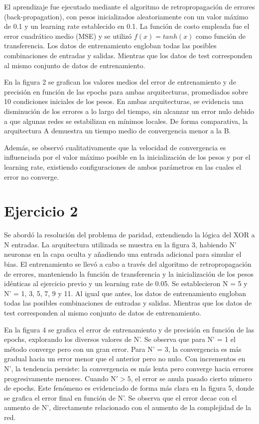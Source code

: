 \documentclass[aps,prb,twocolumn,superscriptaddress,floatfix,longbibliography]{revtex4-2}
\newcounter{para}
\begin{document}
El aprendizaje fue ejecutado mediante el algoritmo de retropropagación de errores (back-propagation), con pesos inicializados aleatoriamente con un valor máximo de 0.1 y un learning rate establecido en 0.1. La función de costo empleada fue el error cuadrático medio (MSE) y se utilizó $f(x) = tanh(x)$ como función de transferencia. Los datos de entrenamiento engloban todas las posibles combinaciones de entradas y salidas. Mientras que los datos de test corresponden al mismo conjunto de datos de entrenamiento.

En la figura 2 se grafican los valores medios del error de entrenamiento y de precisión en función de las epochs para ambas arquitecturas, promediados sobre 10 condiciones iniciales de los pesos. En ambas arquitecturas, se evidencia una disminución de los errores a lo largo del tiempo, sin alcanzar un error nulo debido a que algunas redes se estabilizan en mínimos locales. De forma comparativa, la arquitectura A demuestra un tiempo medio de convergencia menor a la B.


Además, se observó cualitativamente que la velocidad de convergencia es influenciada por el valor máximo posible en la inicialización de los pesos y por el learning rate, existiendo configuraciones de ambos parámetros en las cuales el error no converge.

\section*{Ejercicio 2}



Se abordó la resolución del problema de paridad, extendiendo la lógica del XOR a N entradas. La arquitectura utilizada se muestra en la figura 3, habiendo N' neuronas en la capa oculta y añadiendo una entrada adicional para simular el bias. El entrenamiento se llevó a cabo a través del algoritmo de retropropagación de errores, manteniendo la función de transferencia y la inicialización de los pesos idénticas al ejercicio previo y un learning rate de 0.05. Se establecieron N = 5 y N' = 1, 3, 5, 7, 9 y 11. Al igual que antes, los datos de entrenamiento engloban todas las posibles combinaciones de entradas y salidas. Mientras que los datos de test corresponden al mismo conjunto de datos de entrenamiento.


En la figura 4 se grafica el error de entrenamiento y de precisión en función de las epochs, explorando los diversos valores de N'. Se observa que para N' = 1 el método converge pero con un gran error. Para N' = 3, la convergencia es más gradual hacia un error menor que el anterior pero no nulo. Con incrementos en N', la tendencia persiste: la convergencia es más lenta pero converge hacia errores progresivamente menores. Cuando $\mathrm{N'} > 5$, el error se anula pasado cierto número de epochs. Este fenómeno es evidenciado de forma más clara en la figura 5, donde se grafica el error final en función de N'. Se observa que el error decae con el aumento de N', directamente relacionado con el aumento de la complejidad de la red.
\end{document}
